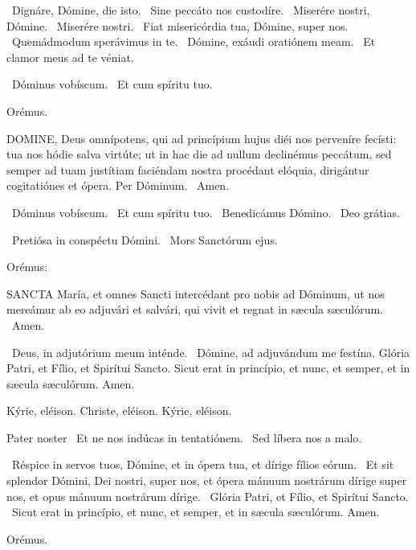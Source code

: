 \V\ Dignáre, Dómine, die isto. \R\ Sine peccáto nos custodíre. \V\ Miserére nostri, Dómine. \R\ Miserére nostri. \V\ Fiat misericórdia tua, Dómine, super nos. \R\ Quemádmodum sperávimus in te. \V\ Dómine, exáudi oratiónem meam. \R\ Et clamor meus ad te véniat.


\V\ Dóminus vobíscum. \R\ Et cum spíritu tuo.

Orémus. 

\lettrine[lines=2]{D}{OMINE}, Deus omnípotens, qui ad princípium hujus diéi nos perveníre fecísti: tua nos hódie salva virtúte; ut in hac die ad nullum declinémus peccátum, sed semper ad tuam justítiam faciéndam nostra procédant elóquia, dirigántur cogitatiónes et ópera. Per Dóminum. \R\ Amen.

\V\ Dóminus vobíscum. \R\ Et cum spíritu tuo. \V\ Benedicámus Dómino. \R\ Deo grátias.


\V\ Pretiósa in conspéctu Dómini. \R\ Mors Sanctórum ejus.

 Orémus:


\lettrine[lines=2]{S}{ANCTA} María, et omnes Sancti intercédant pro nobis ad Dóminum, ut nos mereámur ab eo adjuvári et salvári, qui vivit et regnat in sæcula sæculórum. \R\ Amen.

\V\ Deus, in adjutórium meum inténde. \R\ Dómine, ad adjuvándum me festína.  Glória Patri, et Fílio, et Spirítui Sancto. Sicut erat in princípio, et nunc, et semper, et in sæcula sæculórum. Amen.

Kýrie, eléison. Christe, eléison. Kýrie, eléison.

Pater noster  \V\ Et ne nos indúcas in tentatiónem. \R\ Sed líbera nos a malo.

\V\ Réspice in servos tuos, Dómine, et in ópera tua, et dírige fílios eórum. \R\ Et sit splendor Dómini, Dei nostri, super nos, et ópera mánuum nostrárum dírige super nos, et opus mánuum nostrárum dírige. \V\ Glória Patri, et Fílio, et Spirítui Sancto. \R\ Sicut erat in princípio, et nunc, et semper, et in sæcula sæculórum. Amen.

Orémus. 

